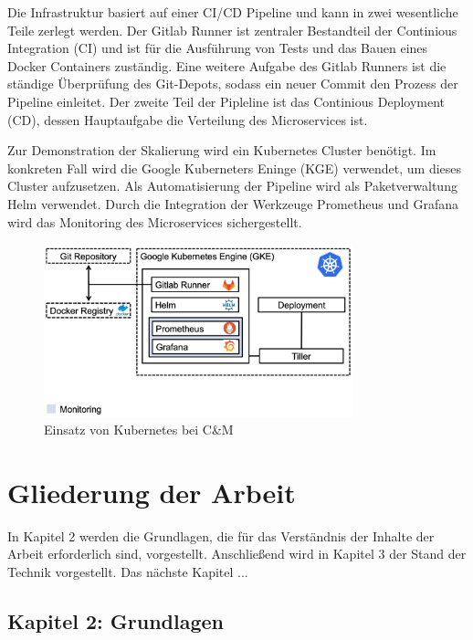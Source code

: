 Die Infrastruktur basiert auf einer CI/CD Pipeline und kann in zwei wesentliche Teile zerlegt werden.
Der Gitlab Runner ist zentraler Bestandteil der Continious Integration (CI) und ist für die Ausführung von Tests und das Bauen eines Docker Containers zuständig.
Eine weitere Aufgabe des Gitlab Runners ist die ständige Überprüfung des Git-Depots, sodass ein neuer Commit den Prozess der Pipeline einleitet.
Der zweite Teil der Pipleline ist das Continious Deployment (CD), dessen Hauptaufgabe die Verteilung des Microservices ist.

Zur Demonstration der Skalierung wird ein Kubernetes Cluster benötigt. 
Im konkreten Fall wird die Google Kuberneters Eninge (KGE) verwendet, um dieses Cluster aufzusetzen.
Als Automatisierung der Pipeline wird als Paketverwaltung Helm verwendet.
Durch die Integration der Werkzeuge Prometheus und Grafana wird das Monitoring des Microservices sichergestellt.

\begin{figure}[h]
	\centering
	\includegraphics[width=0.8\textwidth]{images/demonstrator.png}
	\caption{Einsatz von Kubernetes bei C\&M}
	\label{fig:demonstrator}
\end{figure}

\section{Gliederung der Arbeit}
\label{sec:gliederung}

In Kapitel 2 werden die Grundlagen, die für das Verständnis der Inhalte der Arbeit erforderlich sind, vorgestellt.
Anschließend wird in Kapitel 3 der Stand der Technik vorgestellt.
Das nächste Kapitel ...


\newpage
\subsection*{Kapitel 2: Grundlagen}



